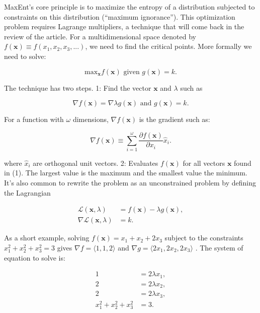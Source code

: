 \documentclass[letterpaper,12pt]{article}
\begin{document}
MaxEnt's core principle is to maximize the entropy of a distribution
subjected to constraints on this distribution (``maximum ignorance''). This
optimization problem requires Lagrange multipliers, a technique that will
come back in the review of the article. For a multidimensional space denoted
by $f(\mathbf{x}) \equiv f(x_{1}, x_{2}, x_{3}, ...)$, we need to find the
critical points. More formally we need to solve:

\begin{equation}
  \mbox{max}_{\mathbf{x}} f(\mathbf{x}) \mbox{ given } g(\mathbf{x}) = k.
\end{equation}

The technique has two steps. 1: Find the vector $\mathbf{x}$ and $\lambda$ such as

\begin{equation}
  \nabla f(\mathbf{x}) = \nabla \lambda g(\mathbf{x}) \mbox { and } g(\mathbf{x}) = k.
\end{equation}

For a function with $\omega$ dimensions, $\nabla f (\mathbf{x})$ is the
gradient such as:

\begin{equation}
  \nabla f (\mathbf{x}) \equiv \sum_{i = 1}^{\omega} \frac{\partial f(\mathbf{x})}{\partial x_{i}} \hat{x}_{i}.
\end{equation}

where $\hat{x}_{i}$ are orthogonal unit vectors. 2: Evaluates $f(\mathbf{x})$
for all vectors $\mathbf{x}$ found in (1). The largest value is the maximum
and the smallest value the minimum. It's also common to rewrite the problem
as an unconstrained problem \cite{gow08} by defining the Lagrangian

\begin{align}
  \mathcal{L}(\mathbf{x}, \lambda) &= f(\mathbf{x}) - \lambda g(\mathbf{x}),\\
  \nabla \mathcal{L}(\mathbf{x}, \lambda) &= k.
\end{align}

As a short example, solving $f(\mathbf{x}) = x_{1} + x_{2} + 2x_{3}$ subject to the
constraints $x_{1}^{2} + x_{2}^{2} + x_{3}^{2} = 3$ gives
$\nabla f = \langle 1, 1, 2 \rangle$ and $\nabla g = \langle 2x_{1}, 2x_{2},
2x_{3} \rangle$ \cite{ste09}. The system of equation to solve is:

\begin{align}
  1 &= 2\lambda x_{1},\label{lag-x1}\\
  2 &= 2\lambda x_{2},\label{lag-x2}\\
  2 &= 2\lambda x_{3},\label{lag-x3}\\
  x_{1}^{2} + x_{2}^{2} + x_{3}^{2} &= 3.
\end{align}
\end{document}

